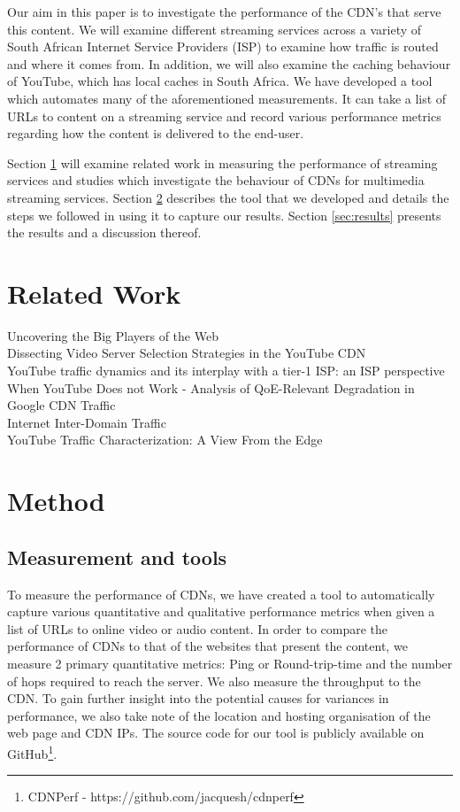 \documentclass{sig-alternate-05-2015}
\begin{document}
Our aim in this paper is to investigate the performance of the CDN's that serve this content. We will examine different streaming services across a variety of South African Internet Service Providers (ISP) to examine how traffic is routed and where it comes from. In addition, we will also examine the caching behaviour of YouTube, which has local caches in South Africa. We have developed a tool which automates many of the aforementioned measurements. It can take a list of URLs to content on a streaming service and record various performance metrics regarding how the content is delivered to the end-user.

Section \ref{sec:related} will examine related work in measuring the performance of streaming services and studies which investigate the behaviour of CDNs for multimedia streaming services. Section \ref{sec:method} describes the tool that we developed and details the steps we followed in using it to capture our results. Section \ref{sec:results} presents the results and a discussion thereof.



\section{Related Work}\label{sec:related}
Uncovering the Big Players of the Web\\
Dissecting Video Server Selection Strategies
in the YouTube CDN\\
YouTube traffic dynamics and its interplay with a tier-1 ISP: an ISP perspective\\
When YouTube Does not Work - Analysis of QoE-Relevant Degradation in Google CDN Traffic\\
Internet Inter-Domain Traffic\\
YouTube Traffic Characterization: A View From the Edge\\

\section{Method}\label{sec:method}
\subsection{Measurement and tools}
%

To measure the performance of CDNs, we have created a tool to automatically capture various quantitative and qualitative performance metrics when given a list of URLs to online video or audio content. In order to compare the performance of CDNs to that of the websites that present the content, we measure 2 primary quantitative metrics: Ping or Round-trip-time and the number of hops required to reach the server. We also measure the throughput to the CDN. To gain further insight into the potential causes for variances in performance, we also take note of the location and hosting organisation of the web page and CDN IPs. The source code for our tool is publicly available on GitHub\footnote{CDNPerf -  https://github.com/jacquesh/cdnperf}.
\end{document}
